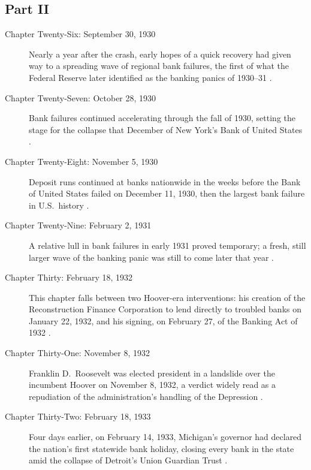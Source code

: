 \documentclass[11pt]{article}
\begin{document}
\subsection*{Part II}

\begin{description}

\item[Chapter Twenty-Six: September 30, 1930] Nearly a year after the crash,
early hopes of a quick recovery had given way to a spreading wave of regional
bank failures, the first of what the Federal Reserve later identified as the
banking panics of 1930--31 \autocite{fedhistorypanics3031}.

\item[Chapter Twenty-Seven: October 28, 1930] Bank failures continued
accelerating through the fall of 1930, setting the stage for the collapse
that December of New York's Bank of United States \autocite{bankofusfail}.

\item[Chapter Twenty-Eight: November 5, 1930] Deposit runs continued at banks
nationwide in the weeks before the Bank of United States failed on December
11, 1930, then the largest bank failure in U.S.\ history \autocite{bankofusfail}.

\item[Chapter Twenty-Nine: February 2, 1931] A relative lull in bank failures
in early 1931 proved temporary; a fresh, still larger wave of the banking
panic was still to come later that year \autocite{fedhistorypanics3031}.

\item[Chapter Thirty: February 18, 1932] This chapter falls between two
Hoover-era interventions: his creation of the Reconstruction Finance
Corporation to lend directly to troubled banks on January 22, 1932, and his
signing, on February 27, of the Banking Act of 1932
\autocite{fedhistorybankingact1932,rfcwiki}.

\item[Chapter Thirty-One: November 8, 1932] Franklin D.\ Roosevelt was elected
president in a landslide over the incumbent Hoover on November 8, 1932, a
verdict widely read as a repudiation of the administration's handling of the
Depression \autocite{crashwiki}.

\item[Chapter Thirty-Two: February 18, 1933] Four days earlier, on February
14, 1933, Michigan's governor had declared the nation's first statewide bank
holiday, closing every bank in the state amid the collapse of Detroit's Union
Guardian Trust \autocite{michiganholiday1933}.


\end{description}
\end{document}
